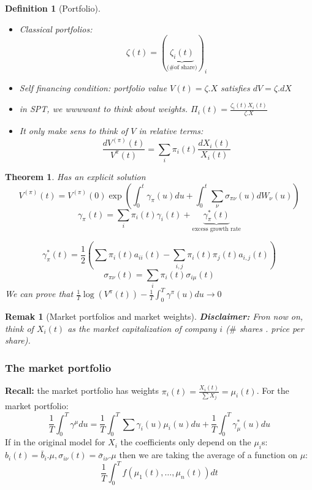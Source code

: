 \documentclass{article} \usepackage[utf8]{inputenc}
\newtheorem{theorem}{Theorem}
\newtheorem{definition}{Definition}
\newtheorem{remark}{Remak}
\begin{document}
\begin{definition}[Portfolio]
  \begin{itemize}
  \item Classical portfolios: $$\zeta(t) = (\underbrace{\zeta_i(t)}_{\text{(\# of share)}})_i$$
  \item Self financing condition:
    portfolio value $V(t) = \zeta.X$ satisfies $dV = \zeta.dX$
  \item in SPT, we wwwwant to think about weights. $\Pi_i(t) = \frac{\zeta_i(t)X_i(t)}{\zeta.X}$
  \item It only make sens to think of $V$ in relative terms:
    $$\frac{dV^{(\pi)}(t)}{V^{\pi}(t)} = \sum_i \pi_i(t) \frac{dX_i(t)}{X_i(t)}$$
  \end{itemize}
\end{definition}
\begin{theorem}
  Has an explicit solution
  $$V^{(\pi)}(t) = V^{(\pi)}(0) \exp( \int_0^t \gamma_{\pi}(u)du + \int_0^t \sum_{\nu} \sigma_{\pi\nu}(u)dW_{\nu}(u))$$
  $$\gamma_\pi(t) = \sum_i \pi_i(t) \gamma_i(t) + \underbrace{\gamma_{\pi}^*(t)}_{\text{excess growth rate}}$$

  $$\gamma_{\pi}^*(t) = \frac12 (\sum \pi_i(t) a_{ii}(t) - \sum_{i, j} \pi_i(t)\pi_j(t)a_{i,j}(t))$$
  $$\sigma_{\pi\nu}(t) = \sum_i \pi_i(t)\sigma_{i\mu}(t)$$
  We can prove that $\frac1T \log(V^{\pi}(t)) - \frac1T \int_0^T\gamma^{\pi}(u)du \rightarrow 0$

\end{theorem}
\begin{remark}[Market portfolios and market weights]
  \textbf{Disclaimer:} Fron now on, think of $X_i(t)$ as the market capitalization of company $i$ ($\#$ shares . price per share).
  
\end{remark}

\subsubsection{The market portfolio}

\textbf{Recall:} the market portfolio has weights $\pi_i(t) = \frac{X_i(t)}{\sum X_j} = \mu_i(t)$.
  For the market portfolio:
  $$\frac1T \int_0^T \gamma^{\mu} du = \frac1T \int_0^T \sum \gamma_i(u)\mu_i(u)du + \frac1T \int_0^T \gamma_{\mu}^*(u)du$$
  If in the original model for $X_i$ the coefficients only depend on the $\mu_i$s:
  $b_i(t) = \bar b_i.\mu, \sigma_{i\nu}(t) = \bar\sigma_{i\nu}.\mu$
  then we are taking the average of a function on $\mu$:
  $$\frac1T \int_0^T f(\mu_1(t), \ldots, \mu_n(t))dt$$
\end{document}
